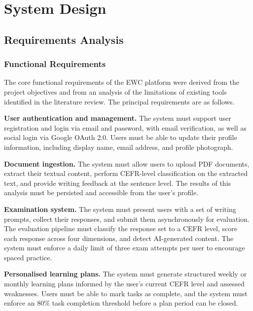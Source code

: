 \documentclass[12pt, a4paper]{report}
\begin{document}
\chapter{System Design}
\label{ch:design}

\section{Requirements Analysis}

\subsection{Functional Requirements}

The core functional requirements of the EWC platform were derived from the project objectives and from an analysis of the limitations of existing tools identified in the literature review. The principal requirements are as follows.

\textbf{User authentication and management.} The system must support user registration and login via email and password, with email verification, as well as social login via Google OAuth 2.0. Users must be able to update their profile information, including display name, email address, and profile photograph.

\textbf{Document ingestion.} The system must allow users to upload PDF documents, extract their textual content, perform CEFR-level classification on the extracted text, and provide writing feedback at the sentence level. The results of this analysis must be persisted and accessible from the user's profile.

\textbf{Examination system.} The system must present users with a set of writing prompts, collect their responses, and submit them asynchronously for evaluation. The evaluation pipeline must classify the response set to a CEFR level, score each response across four dimensions, and detect AI-generated content. The system must enforce a daily limit of three exam attempts per user to encourage spaced practice.

\textbf{Personalised learning plans.} The system must generate structured weekly or monthly learning plans informed by the user's current CEFR level and assessed weaknesses. Users must be able to mark tasks as complete, and the system must enforce an 80\% task completion threshold before a plan period can be closed.
\end{document}
